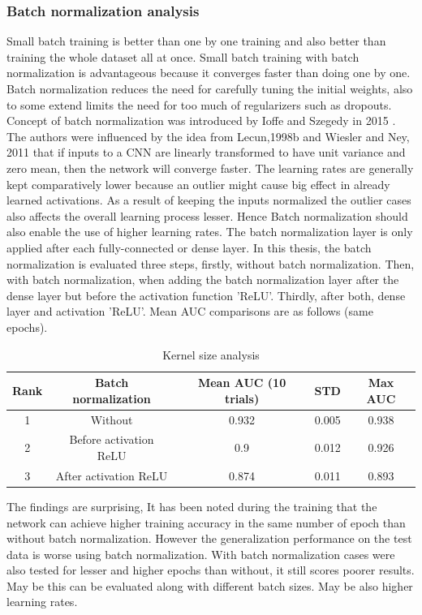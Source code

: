 \subsubsection{Batch normalization analysis}
Small batch training is better than one by one training and also better than
training the whole dataset all at once. Small batch training with batch normalization is advantageous because it converges faster than doing one by one. Batch normalization reduces the need for carefully tuning the 
initial weights, also to some extend limits the need for too much of regularizers such as dropouts. Concept of batch normalization was introduced by Ioffe and Szegedy in 2015 \cite{ioffe2015batch}. 
The authors were influenced by the idea from Lecun,1998b \cite{lecun1998gradient} and Wiesler and Ney, 2011 \cite{wiesler2011convergence} that if inputs to a CNN are linearly transformed to have unit 
variance and zero mean, then the network will converge faster. The learning rates are generally kept comparatively lower because 
an outlier might cause big effect in already learned activations. As a result of keeping the inputs normalized the outlier cases also affects the overall learning process lesser. Hence Batch normalization
should also enable the use of higher learning rates. The batch normalization layer is only applied after each fully-connected or dense layer. In this thesis, the batch normalization is evaluated three steps, firstly, without batch normalization. 
Then, with batch normalization, when adding the batch normalization layer after the dense layer but before the activation function 'ReLU'. Thirdly, after both, dense layer and activation 'ReLU'. Mean AUC comparisons are as follows
(same epochs).
\begin{table}
 \centering
    \begin{tabular}{|c c c c c|} 
      \hline\hline
      Rank & Batch normalization & Mean AUC (10 trials) & STD & Max AUC\\[0.5ex] 
      \hline
      1 & Without &  0.932 & 0.005 & 0.938\\      
      \hline
      2 & Before activation ReLU & 0.9 & 0.012 & 0.926\\   
      \hline
      3 & After activation ReLU &  0.874 & 0.011 & 0.893\\   
      \hline \hline
    \end{tabular}
  \caption{Kernel size analysis}
  \label{table:batch_normalization}
\end{table}

The findings are surprising, It has been noted during the training that the network can achieve higher training accuracy in the same number of epoch than without batch normalization. However the generalization performance on the 
test data is worse using batch normalization. With batch normalization cases were also tested for lesser and higher epochs than without, it still scores poorer results. May be this can be evaluated along with different batch sizes. 
May be also higher learning rates.

